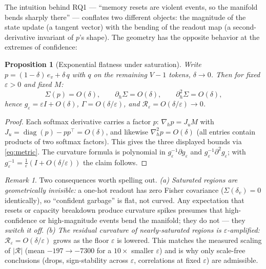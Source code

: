 \documentclass[11pt,a4paper]{article}
\newtheorem{prop}{Proposition}
\theoremstyle{definition}
\theoremstyle{remark}
\newtheorem{rem}{Remark}
\begin{document}
The intuition behind RQ1 --- ``memory resets are violent events, so the manifold bends sharply
there'' --- conflates two different objects: the magnitude of the state update (a tangent vector)
with the bending of the readout map (a second-derivative invariant of $p$'s shape). The geometry
has the opposite behavior at the extremes of confidence:

\begin{prop}[Exponential flatness under saturation]
Write $p = (1-\delta)\,e_v + \delta\,q$ with $q$ on the remaining $V-1$ tokens, $\delta \to 0$.
Then for fixed $\varepsilon > 0$ and fixed $M$:
\[
\Sigma(p) = O(\delta), \qquad
\partial_h \Sigma = O(\delta), \qquad
\partial_h^2 \Sigma = O(\delta),
\]
hence
$g_\varepsilon = \varepsilon I + O(\delta)$,
$\Gamma = O(\delta/\varepsilon)$, and
$\mathcal{R}_\varepsilon = O(\delta/\varepsilon) \to 0$.
\end{prop}

\begin{proof}
Each softmax derivative carries a factor $p$: $\nabla_h p = J_u M$ with
$J_u = \operatorname{diag}(p) - pp^\top = O(\delta)$, and likewise $\nabla_h^2 p = O(\delta)$
(all entries contain products of two softmax factors). This gives the three displayed bounds via
\eqref{eq:metric}. The curvature formula is polynomial in $g_\varepsilon^{-1}\partial g_\varepsilon$
and $g_\varepsilon^{-1}\partial^2 g_\varepsilon$; with
$g_\varepsilon^{-1} = \tfrac1\varepsilon(I + O(\delta/\varepsilon))$ the claim follows.
\end{proof}

\begin{rem}
Two consequences worth spelling out.
\emph{(a) Saturated regions are geometrically invisible:} a one-hot readout has zero Fisher
covariance ($\Sigma(\delta_v) = 0$ identically), so ``confident garbage'' is flat, not curved.
Any expectation that resets or capacity breakdown produce curvature spikes presumes that
high-confidence or high-magnitude events bend the manifold; they do not --- they \emph{switch it
off}.
\emph{(b) The residual curvature of nearly-saturated regions is $\varepsilon$-amplified:}
$\mathcal{R}_\varepsilon = O(\delta/\varepsilon)$ grows as the floor $\varepsilon$ is lowered.
This matches the measured scaling of $|\mathcal{R}|$ (mean $-197 \to -7300$ for a $10\times$
smaller $\varepsilon$) and is why only scale-free conclusions (drops, sign-stability across
$\varepsilon$, correlations at fixed $\varepsilon$) are admissible.
\end{rem}
\end{document}
